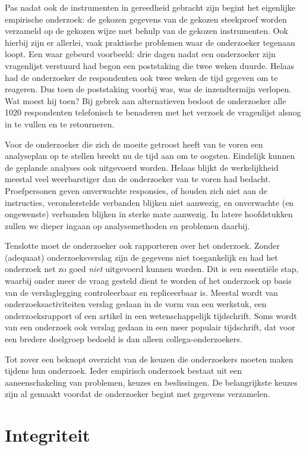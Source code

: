 \documentclass[
]{book}
\begin{document}
Pas nadat ook de instrumenten in gereedheid gebracht zijn begint het
eigenlijke empirische onderzoek: de gekozen gegevens van de gekozen
steekproef worden verzameld op de gekozen wijze met behulp van de
gekozen instrumenten. Ook hierbij zijn er allerlei, vaak praktische
problemen waar de onderzoeker tegenaan loopt. Een waar gebeurd
voorbeeld: drie dagen nadat een onderzoeker zijn vragenlijst verstuurd
had begon een poststaking die twee weken duurde. Helaas had de
onderzoeker de respondenten ook twee weken de tijd gegeven om te
reageren. Dus toen de poststaking voorbij was, was de inzendtermijn
verlopen. Wat moest hij toen? Bij gebrek aan alternatieven besloot de
onderzoeker alle 1020 respondenten telefonisch te benaderen met het
verzoek de vragenlijst alsnog in te vullen en te retourneren.

Voor de onderzoeker die zich de moeite getroost heeft van te voren een
analyseplan op te stellen breekt nu de tijd aan om te oogsten. Eindelijk
kunnen de geplande analyses ook uitgevoerd worden. Helaas blijkt de
werkelijkheid meestal veel weerbarstiger dan de onderzoeker van te voren
had bedacht. Proefpersonen geven onverwachte responsies, of houden zich
niet aan de instructies, veronderstelde verbanden blijken niet aanwezig,
en onverwachte (en ongewenste) verbanden blijken in sterke mate
aanwezig. In latere hoofdstukken zullen we dieper ingaan op
analysemethoden en problemen daarbij.

Tenslotte moet de onderzoeker ook rapporteren over het onderzoek. Zonder
(adequaat) onderzoeksverslag zijn de gegevens niet toegankelijk en had
het onderzoek net zo goed \emph{niet} uitgevoerd kunnen worden. Dit is een
essentiële stap, waarbij onder meer de vraag gesteld dient te worden of
het onderzoek op basis van de verslaglegging controleerbaar en
repliceerbaar is. Meestal wordt van onderzoeksactiviteiten verslag
gedaan in de vorm van een werkstuk, een onderzoeksrapport of een artikel in een wetenschappelijk tijdschrift. Soms wordt van een onderzoek ook
verslag gedaan in een meer populair tijdschrift, dat voor een bredere
doelgroep bedoeld is dan alleen collega-onderzoekers.

Tot zover een beknopt overzicht van de keuzen die onderzoekers moeten
maken tijdens hun onderzoek. Ieder empirisch onderzoek bestaat uit een
aaneenschakeling van problemen, keuzes en beslissingen. De belangrijkste
keuzes zijn al gemaakt voordat de onderzoeker begint met gegevens
verzamelen.

\hypertarget{ch:integriteit}{%
\chapter{Integriteit}\label{ch:integriteit}}
\end{document}

